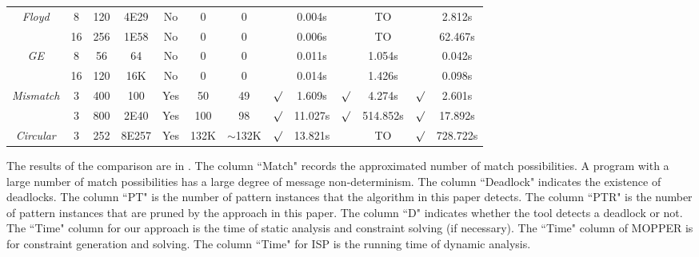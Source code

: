 \begin{savenotes}
\begin{table*}[t]
\begin{center}
\begin{threeparttable}
\begin{tabular}{|c|c|c|c|c|c|c|c|c|c|c|c|c|}
						       
	    \multirow{2}{*}{\textit{Floyd}} & 8 & 120 &  4E29 
          						        & No  &0 &0&  & 0.004s &  & TO &  & 2.812s\\ \cline{2-13}
						       		& 16 & 256 &  1E58 
          						         & No  &0 & 0&  & 0.006s &  & TO &  & 62.467s\\ \hline
						        \hline
	    \multirow{2}{*}{\textit{GE}} & 8 & 56 & 64  
          						        & No  &0 &0&  & 0.011s &  & 1.054s &  & 0.042s\\ \cline{2-13}
						       		& 16 & 120 & 16K  
          						         & No  &0 & 0&  & 0.014s &  & 1.426s &  & 0.098s\\ \hline
						        \hline
			        
             
						        
	     \multirow{2}{*}{\textit{Mismatch}} & 3 & 400 & 100  & Yes  &50 &49 & $\surd$ & 1.609s  & $\surd$  & 4.274s & $\surd$ & 2.601s\\ \cline{2-13}
          					& 3 & 800 & 2E40  & Yes  &100& 98 & $\surd$ & 11.027s  & $\surd$ & 514.852s & $\surd$ & 17.892s\\ \hline
          \hline
          
           \textit{Circular} & 3 & 252 & 8E257  & Yes  & 132K & $\sim$132K & $\surd$ & 13.821s  &  & TO & $\surd$ & 728.722s\\ \hline

						                       
\end{tabular}
\end{threeparttable}
\end{center}
\end{table*}
\end{savenotes}

The results of the comparison are in . The column ``Match" records the approximated number of match possibilities. A program with a large number of match possibilities has a large degree of message non-determinism. The column ``Deadlock" indicates the existence of deadlocks. The column ``PT" is the number of pattern instances that the algorithm in this paper detects. The column ``PTR" is the number of pattern instances that are pruned by the approach in this paper. The column ``D" indicates whether the tool detects a deadlock or not. The ``Time" column for our approach is the time of static analysis and constraint solving (if necessary). The ``Time" column of MOPPER is for constraint generation and solving. The column ``Time" for ISP is the running time of dynamic analysis. 

